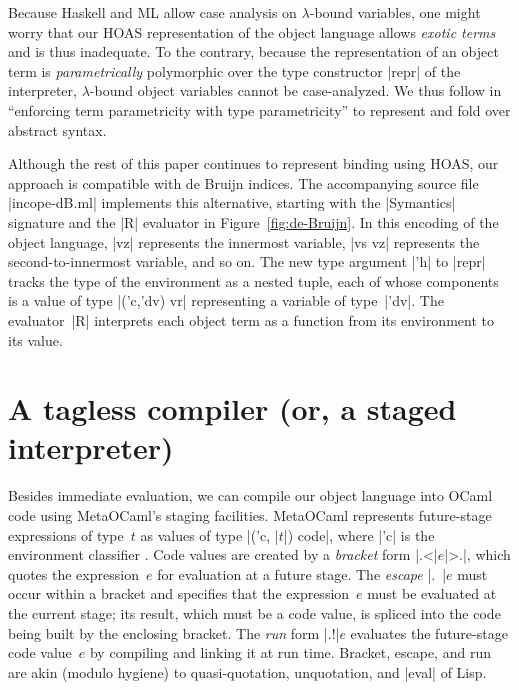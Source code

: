 Because Haskell and ML allow case analysis on $\lambda$-bound variables,
one might worry that our HOAS representation of the object language
allows \emph{exotic terms} and is thus inadequate.  To the contrary,
because the representation of an object term is \emph{parametrically}
polymorphic over the type constructor |repr| of the interpreter,
$\lambda$-bound object variables cannot be case-analyzed.
We thus follow \citet{washburn-boxes-jfp} in ``enforcing term
parametricity with type parametricity'' to represent and fold over
abstract syntax.

Although the rest of this paper continues to represent binding
using HOAS\@, our approach is compatible with de Bruijn indices.
The accompanying source file |incope-dB.ml| implements this
alternative, starting with the |Symantics| signature and the |R|
evaluator in Figure~\ref{fig:de-Bruijn}.
In this encoding of the object language, |vz| represents the
innermost variable, |vs vz| represents the second-to-innermost variable,
and so on.  The new type argument |'h| to |repr| tracks the type of
the environment as a nested tuple, each of whose components is a
value of type |('c,'dv) vr| representing a variable of type~|'dv|.
The evaluator~|R| interprets each object term as a function
from its environment to its value.

\section{A tagless compiler (or, a staged interpreter)}\label{S:compiler}

Besides immediate evaluation, we can compile our object language
into OCaml code using MetaOCaml's staging facilities. MetaOCaml
represents future-stage expressions of type~$t$
as values of type |('c, |$t$|) code|, where |'c| is the
environment classifier \citep{WalidPOPL03,calcagno-ml-like}. Code values are created
by a \emph{bracket} form |.<|$e$|>.|, which quotes the expression~$e$ for
evaluation at a future stage. The \emph{escape} |.~|$e$ must occur
within a bracket and specifies that the expression~$e$ must be evaluated
at the current stage; its result, which must be a code value, is
spliced into the code being built by the enclosing bracket. The \emph{run} form |.!|$e$ evaluates
the future-stage code value~$e$ by compiling and linking it at run time.
Bracket, escape, and run are akin (modulo hygiene) to
quasi-quotation, unquotation, and |eval| of Lisp.

